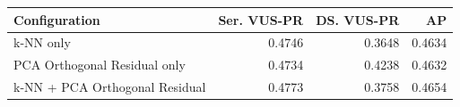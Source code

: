 \begin{tabular}{lrrr}
\toprule
Configuration & Ser. VUS-PR & DS. VUS-PR & AP \\
\midrule
k-NN only & 0.4746 & 0.3648 & 0.4634 \\
PCA Orthogonal Residual only & 0.4734 & 0.4238 & 0.4632 \\
k-NN + PCA Orthogonal Residual & 0.4773 & 0.3758 & 0.4654 \\
\bottomrule
\end{tabular}